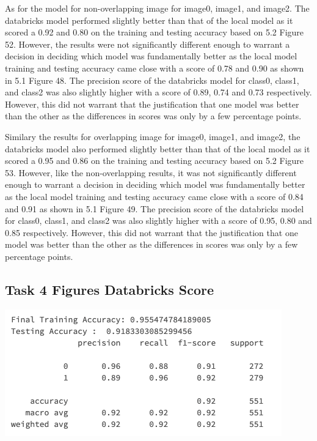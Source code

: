 \documentclass[12pt]{article}
\begin{document}
\begin{multicols*}{2}
  \hspace*{5mm} As for the model for non-overlapping image for image0, image1, and image2. The databricks model performed slightly better than that of the local model as it scored a 0.92 and 0.80 on the training and testing accuracy based on
  5.2 Figure 52. However, the results were not significantly different enough to warrant a decision in deciding which model was fundamentally better as the local model training and testing accuracy came close with a score of 
  0.78 and 0.90 as shown in 5.1 Figure 48. The precision score of the databricks model for class0, class1, and class2 was also slightly higher with a score of 0.89, 0.74 and 0.73 respectively. However, this did not warrant 
  that the justification that one model was better than the other as the differences in scores was only by a few percentage points.

  \hspace*{5mm} Similary the results for overlapping image for image0, image1, and image2, the databricks model also performed slightly better than that of the local model as it scored a 0.95 and 0.86 on the training and testing accuracy based on
  5.2 Figure 53. However, like the non-overlapping results, it was not significantly different enough to warrant a decision in deciding which model was fundamentally better as the local model training and testing accuracy came close with a score of 
  0.84 and 0.91 as shown in 5.1 Figure 49. The precision score of the databricks model for class0, class1, and class2 was also slightly higher with a score of 0.95, 0.80 and 0.85 respectively. However, this did not warrant 
  that the justification that one model was better than the other as the differences in scores was only by a few percentage points.



  \subsection{Task 4 Figures Databricks Score}
  \begin{center}
		\includegraphics[scale=0.4]{../screenshot/Non-Overlapping/score01.png}
  


\end{center}
\end{multicols*}
\end{document}
